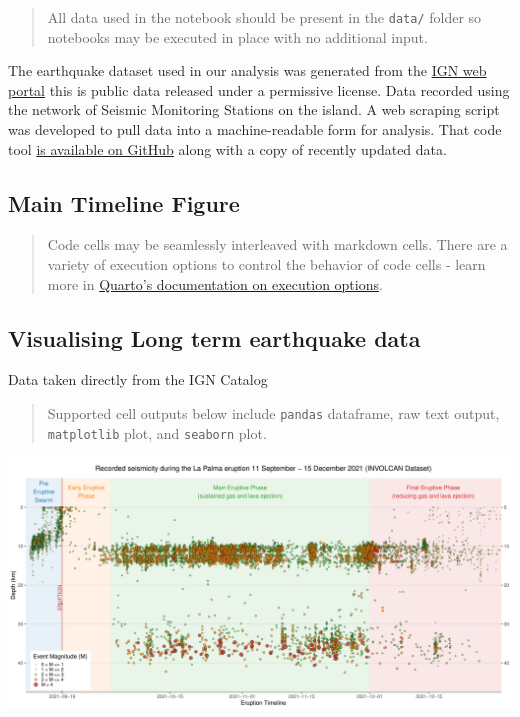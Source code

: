 \documentclass[
]{agujournal2019}
\begin{document}
\begin{quote}
All data used in the notebook should be present in the \texttt{data/}
folder so notebooks may be executed in place with no additional input.
\end{quote}

The earthquake dataset used in our analysis was generated from the
\href{https://www.ign.es/web/resources/volcanologia/tproximos/canarias.html}{IGN
web portal} this is public data released under a permissive license.
Data recorded using the network of Seismic Monitoring Stations on the
island. A web scraping script was developed to pull data into a
machine-readable form for analysis. That code tool
\href{https://github.com/stevejpurves/ign-earthquake-data}{is available
on GitHub} along with a copy of recently updated data.

\subsection{Main Timeline Figure}\label{main-timeline-figure}

\begin{quote}
Code cells may be seamlessly interleaved with markdown cells. There are
a variety of execution options to control the behavior of code cells -
learn more in
\href{https://quarto.org/docs/computations/execution-options.html}{Quarto's
documentation on execution options}.
\end{quote}

\subsection{Visualising Long term earthquake
data}\label{visualising-long-term-earthquake-data}

Data taken directly from the IGN Catalog

\begin{quote}
Supported cell outputs below include \texttt{pandas} dataframe, raw text
output, \texttt{matplotlib} plot, and \texttt{seaborn} plot.
\end{quote}

\includegraphics{index_files/figure-pdf/plot-timeline-1.pdf}
\end{document}

